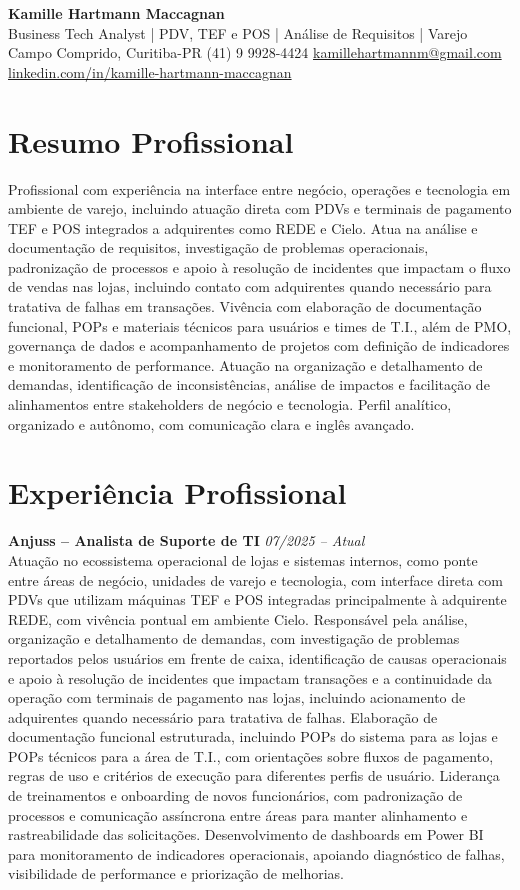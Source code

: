 \documentclass[11pt,a4paper]{article}
\newcommand{\cvheader}[4]{%
  \begin{center}
    {\LARGE\bfseries #1}\\[4pt]
    {\large #2}\\[6pt]
    #3\\[2pt]
    #4
  \end{center}
  \vspace{4pt}
}
\newcommand{\experience}[3]{%
  \textbf{#1} \hfill \textit{#2}\\[4pt]
  #3
  \vspace{8pt}
}
\begin{document}
\cvheader{Kamille Hartmann Maccagnan}%
{Business Tech Analyst | PDV, TEF e POS | Análise de Requisitos | Varejo}%
{Campo Comprido, Curitiba-PR \textbullet{} (41) 9 9928-4424 \textbullet{} \href{mailto:kamillehartmannm@gmail.com}{kamillehartmannm@gmail.com}}%
{\href{https://linkedin.com/in/kamille-hartmann-maccagnan/}{linkedin.com/in/kamille-hartmann-maccagnan}}

\section*{Resumo Profissional}

Profissional com experiência na interface entre negócio, operações e tecnologia em ambiente de varejo, incluindo atuação direta com PDVs e terminais de pagamento TEF e POS integrados a adquirentes como REDE e Cielo. Atua na análise e documentação de requisitos, investigação de problemas operacionais, padronização de processos e apoio à resolução de incidentes que impactam o fluxo de vendas nas lojas, incluindo contato com adquirentes quando necessário para tratativa de falhas em transações. Vivência com elaboração de documentação funcional, POPs e materiais técnicos para usuários e times de T.I., além de PMO, governança de dados e acompanhamento de projetos com definição de indicadores e monitoramento de performance. Atuação na organização e detalhamento de demandas, identificação de inconsistências, análise de impactos e facilitação de alinhamentos entre stakeholders de negócio e tecnologia. Perfil analítico, organizado e autônomo, com comunicação clara e inglês avançado.

\section*{Experiência Profissional}

\experience{Anjuss -- Analista de Suporte de TI}{07/2025 -- Atual}{%
Atuação no ecossistema operacional de lojas e sistemas internos, como ponte entre áreas de negócio, unidades de varejo e tecnologia, com interface direta com PDVs que utilizam máquinas TEF e POS integradas principalmente à adquirente REDE, com vivência pontual em ambiente Cielo. Responsável pela análise, organização e detalhamento de demandas, com investigação de problemas reportados pelos usuários em frente de caixa, identificação de causas operacionais e apoio à resolução de incidentes que impactam transações e a continuidade da operação com terminais de pagamento nas lojas, incluindo acionamento de adquirentes quando necessário para tratativa de falhas. Elaboração de documentação funcional estruturada, incluindo POPs do sistema para as lojas e POPs técnicos para a área de T.I., com orientações sobre fluxos de pagamento, regras de uso e critérios de execução para diferentes perfis de usuário. Liderança de treinamentos e onboarding de novos funcionários, com padronização de processos e comunicação assíncrona entre áreas para manter alinhamento e rastreabilidade das solicitações. Desenvolvimento de dashboards em Power BI para monitoramento de indicadores operacionais, apoiando diagnóstico de falhas, visibilidade de performance e priorização de melhorias.}
\end{document}
